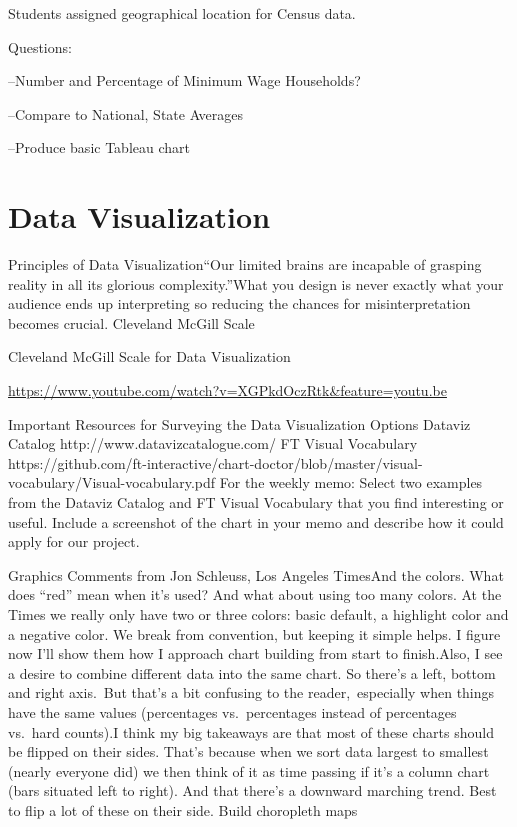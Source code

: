 \documentclass[]{book}
\begin{document}
Students assigned geographical location for Census data.

Questions:

--Number and Percentage of Minimum Wage Households?

--Compare to National, State Averages

--Produce basic Tableau chart

\hypertarget{data-visualization}{%
\chapter{Data Visualization}\label{data-visualization}}

Principles of Data Visualization``Our limited brains are incapable of grasping reality in all its glorious complexity.''What you design is never exactly what your audience ends up interpreting so reducing the chances for misinterpretation becomes crucial. Cleveland McGill Scale

Cleveland McGill Scale for Data Visualization

\url{https://www.youtube.com/watch?v=XGPkdOczRtk\&feature=youtu.be}

Important Resources for Surveying the Data Visualization Options Dataviz Catalog http://www.datavizcatalogue.com/ FT Visual Vocabulary https://github.com/ft-interactive/chart-doctor/blob/master/visual-vocabulary/Visual-vocabulary.pdf For the weekly memo: Select two examples from the Dataviz Catalog and FT Visual Vocabulary that you find interesting or useful. Include a screenshot of the chart in your memo and describe how it could apply for our project.

Graphics Comments from Jon Schleuss, Los Angeles TimesAnd the colors. What does ``red'' mean when it's used? And what about using too many colors. At the Times we really only have two or three colors: basic default, a highlight color and a negative color. We break from convention, but keeping it simple helps. I figure now I'll show them how I approach chart building from start to finish.Also, I see a desire to combine different data into the same chart. So there's a left, bottom and right axis.~But that's a bit confusing to the reader,~especially when things have the same values (percentages vs.~percentages instead of percentages vs.~hard counts).I think my big takeaways are that most of these charts should be flipped on their sides. That's because when we sort data largest to smallest (nearly everyone did) we then think of it as time passing if it's a column chart (bars situated left to right). And that there's a downward marching trend. Best to flip a lot of these on their side. Build choropleth maps
\end{document}
